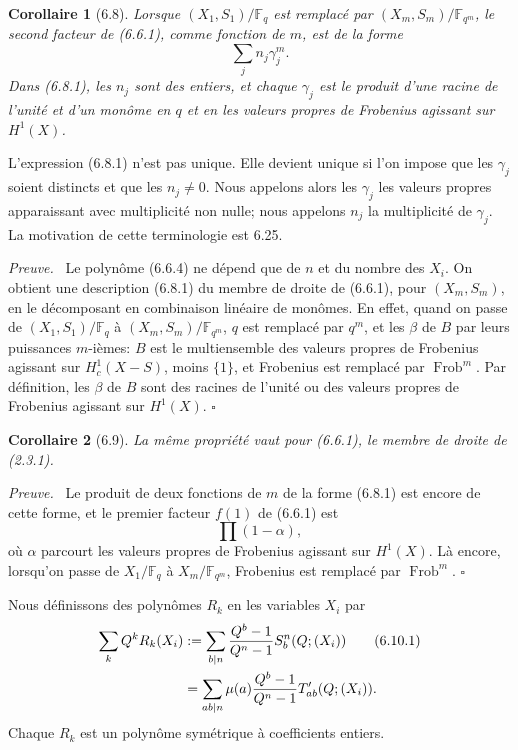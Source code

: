 \documentclass[10pt]{article}
\newcommand{\Fq}{\mathbb F_q}
\newcommand{\Fb}{\mathbb F}
\newcommand{\Frob}{\operatorname{Frob}}
\theoremstyle{deligne}
\newtheorem*{corollary*}{Corollaire}
\newenvironment{proofdel}[1][Preuve.]{\textit{#1}\ }{\hfill$\square$}
\newcommand{\heading}[1]{\vspace{0.7em}\noindent{\bfseries #1}\quad}
\begin{document}
\begin{corollary*}[6.8]
Lorsque $(X_1,S_1)/\Fq$ est remplacé par $(X_m,S_m)/\Fb_{q^m}$, le second facteur de (6.6.1), comme fonction de $m$, est de la forme
\begin{equation}\tag{6.8.1}
\sum_j n_j\gamma_j^m.
\end{equation}
Dans (6.8.1), les $n_j$ sont des entiers, et chaque $\gamma_j$ est le produit d'une racine de l'unité et d'un monôme en $q$ et en les valeurs propres de Frobenius agissant sur $H^1(X)$.
\end{corollary*}
L'expression (6.8.1) n'est pas unique. Elle devient unique si l'on impose que les $\gamma_j$ soient distincts et que les $n_j\ne0$. Nous appelons alors les $\gamma_j$ les valeurs propres apparaissant avec multiplicité non nulle; nous appelons $n_j$ la multiplicité de $\gamma_j$. La motivation de cette terminologie est 6.25.

\begin{proofdel}
Le polynôme (6.6.4) ne dépend que de $n$ et du nombre des $X_i$. On obtient une description (6.8.1) du membre de droite de (6.6.1), pour $(X_m,S_m)$, en le décomposant en combinaison linéaire de monômes. En effet, quand on passe de $(X_1,S_1)/\Fq$ à $(X_m,S_m)/\Fb_{q^m}$, $q$ est remplacé par $q^m$, et les $\beta$ de $B$ par leurs puissances $m$-ièmes: $B$ est le multiensemble des valeurs propres de Frobenius agissant sur $H^1_c(X-S)$, moins $\{1\}$, et Frobenius est remplacé par $\Frob^m$. Par définition, les $\beta$ de $B$ sont des racines de l'unité ou des valeurs propres de Frobenius agissant sur $H^1(X)$.
\end{proofdel}

\begin{corollary*}[6.9]
La même propriété vaut pour (6.6.1), le membre de droite de (2.3.1).
\end{corollary*}
\begin{proofdel}
Le produit de deux fonctions de $m$ de la forme (6.8.1) est encore de cette forme, et le premier facteur $f(1)$ de (6.6.1) est
\[
\prod(1-\alpha),
\]
où $\alpha$ parcourt les valeurs propres de Frobenius agissant sur $H^1(X)$. Là encore, lorsqu'on passe de $X_1/\Fq$ à $X_m/\Fb_{q^m}$, Frobenius est remplacé par $\Frob^m$.
\end{proofdel}

\heading{6.10.} Nous définissons des polynômes $R_k$ en les variables $X_i$ par
\begin{align}
\sum_k Q^kR_k(X_i)&:=\sum_{b\mid n}\frac{Q^b-1}{Q^n-1}S_b^n(Q;(X_i))\tag{6.10.1}\\
&=\sum_{ab\mid n}\mu(a)\frac{Q^b-1}{Q^n-1}T'_{ab}(Q;(X_i)).\notag
\end{align}
Chaque $R_k$ est un polynôme symétrique à coefficients entiers.
\end{document}
